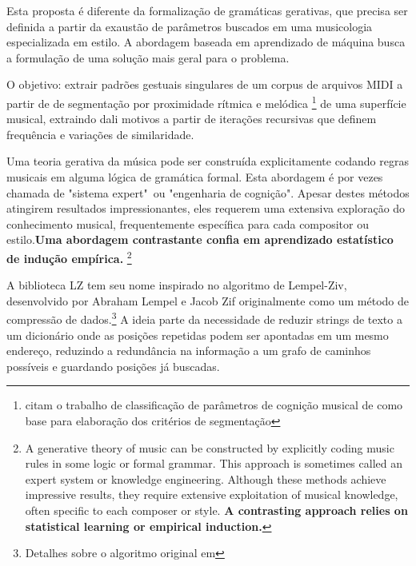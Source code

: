 \documentclass[
	12pt,				%
	openright,			%
	twoside,			%
	a4paper,			%
	english,			%
	french,				%
	spanish,			%
	brazil				%
	]{abntex2}
\begin{document}
Esta proposta é diferente da formalização de gramáticas gerativas, que precisa ser definida a partir da exaustão de parâmetros buscados em uma musicologia especializada em estilo. A abordagem baseada em aprendizado de máquina busca a formulação de uma solução mais geral para o problema.

O objetivo: extrair padrões gestuais singulares de um corpus de arquivos MIDI a partir de de segmentação por proximidade rítmica e melódica \footnote{  citam o trabalho de classificação de parâmetros de cognição musical de  como base para elaboração dos critérios de segmentação } de uma superfície musical, extraindo dali motivos a partir de iterações recursivas que definem frequência e variações de similaridade.

\begin{citacao}
Uma teoria gerativa da música pode ser construída explicitamente codando regras musicais em alguma lógica de gramática formal. Esta abordagem é por vezes chamada de "sistema expert"\ ou "engenharia de cognição". Apesar destes métodos atingirem resultados impressionantes, eles requerem uma extensiva exploração do conhecimento musical, frequentemente específica para cada compositor ou estilo.\textbf{Uma abordagem contrastante confia em aprendizado estatístico de indução empírica.} \cite[p. 74, grifos nossos]{dubnov2003using}\footnote{A generative theory of music can be constructed by explicitly coding music rules in some logic or formal grammar. This approach is sometimes called an expert system or knowledge engineering. Although these methods achieve impressive results, they require extensive exploitation of musical knowledge, often specific to each composer or style.
\textbf{A contrasting approach relies on statistical learning or empirical induction.}\cite[p. 74, grifos nossos]{dubnov2003using}}
\end{citacao}

A biblioteca LZ tem seu nome inspirado no algoritmo de Lempel-Ziv, desenvolvido por Abraham Lempel e Jacob Zif originalmente como um método de compressão de dados.\footnote{Detalhes sobre o algoritmo original em } A ideia parte da necessidade de reduzir strings de texto a um dicionário onde as posições repetidas podem ser apontadas em um mesmo endereço, reduzindo a redundância na informação a um grafo de caminhos possíveis e guardando posições já buscadas.
\end{document}
